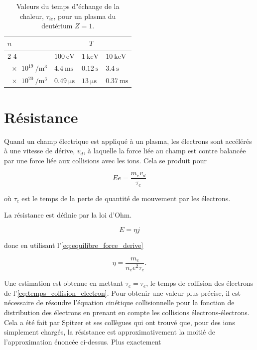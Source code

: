 \documentclass[main.tex]{subfiles}
\begin{document}
\begin{table}[ h ]
	\centering
	\caption{Valeurs du temps d"échange de la chaleur, \( \tau_{ie} \), pour un plasma du deutérium \( Z=1 \).}
	\begin{tabular}{l l l l}
	\hline
	\( n \) & \multicolumn{3}{c}{\( T \)}\\
	\cline{2-4}
	 & \( \SI{100}{\electronvolt} \) & \( \SI{1}{\kilo\electronvolt} \) & \( \SI{10}{\kilo\electronvolt} \)\\
	 \hline
	 \( \SI{e19}{\per\meter\cubed} \) & \( \SI{4.4}{\milli\second} \)& \( \SI{0.12}{\second} \) & \( \SI{3.4}{\second} \)\\
	 \( \SI{e20}{\per\meter\cubed} \) & \( \SI{0.49}{\micro\second} \)& \( \SI{13}{\micro\second} \) & \( \SI{0.37}{\milli\second} \)\\
	 \hline
	\end{tabular}
	\label{tab:temps_plasma_deuterium}
\end{table}

\FloatBarrier
\section{Résistance}
\label{sec:resistance}

Quand un champ électrique est appliqué à un plasma, les électrons sont accélérés à une vitesse de dérive, \( v_d \), à laquelle la force liée au champ est contre balancée par une force liée aux collisions avec les ions.
Cela se produit pour

\begin{equation}
	Ee = \frac{m_e v_d}{\tau_c}
	\label{eq:equilibre_force_derive}
\end{equation}

\noindent où \( \tau_c \) est le temps de la perte de quantité de mouvement par les électrons.

La résistance est définie par la loi d'Ohm.

\[
	E = \eta j
\]

\noindent donc en utilisant l'\autoref{eq:equilibre_force_derive}

\[
	\eta = \frac{m_e}{n_e e^2 \tau_c}.
\]

\noindent Une estimation est obtenue en mettant \( \tau_c = \tau_e \), le temps de collision des électrons de l'\autoref{eq:temps_collision_electron}.
Pour obtenir une valeur plus précise, il est nécessaire de résoudre l'équation cinétique collisionnelle pour la fonction de distribution des électrons en prenant en compte les collisions électrons-électrons.
Cela a été fait par Spitzer et ses collègues qui ont trouvé que, pour des ions simplement chargés, la résistance est approximativement la moitié de l'approximation énoncée ci-dessus.
Plus exactement
\end{document}
